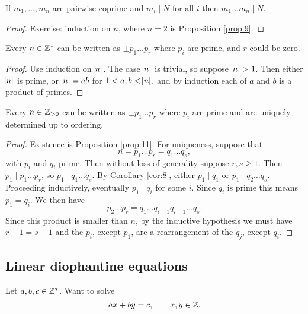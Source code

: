 \begin{corollary}
\label{cor:10}
If $ m_1, \dots, m_n $ are pairwise coprime and $ m_i \mid N $ for all $ i $ then $ m_1 \dots m_n \mid N $.
\end{corollary}

\begin{proof}
Exercise: induction on $ n $, where $ n = 2 $ is Proposition \ref{prop:9}.
\end{proof}

\begin{proposition}
\label{prop:11}
Every $ n \in \mathbb{Z}^* $ can be written as $ \pm p_1 \dots p_r $ where $ p_i $ are prime, and $ r $ could be zero.
\end{proposition}

\begin{proof}
Use induction on $ \abs{n} $. The case $ \abs{n} $ is trivial, so suppose $ \abs{n} > 1 $. Then either $ \abs{n} $ is prime, or $ \abs{n} = ab $ for $ 1 < a, b < \abs{n} $, and by induction each of $ a $ and $ b $ is a product of primes.
\end{proof}

\begin{theorem}
Every $ n \in \mathbb{Z}_{> 0} $ can be written as $ \pm p_1 \dots p_r $ where $ p_i $ are prime and are uniquely determined up to ordering.
\end{theorem}

\begin{proof}
Existence is Proposition \ref{prop:11}. For uniqueness, suppose that
$$ n = p_1 \dots p_r = q_1 \dots q_s, $$
with $ p_i $ and $ q_i $ prime. Then without loss of generality suppose $ r, s \ge 1 $. Then $ p_1 \mid p_1 \dots p_r $, so $ p_1 \mid q_1 \dots q_s $. By Corollary \ref{cor:8}, either $ p_1 \mid q_1 $ or $ p_1 \mid q_2 \dots q_s $. Proceeding inductively, eventually $ p_1 \mid q_i $ for some $ i $. Since $ q_i $ is prime this means $ p_1 = q_i $. We then have
$$ p_2 \dots p_r = q_1 \dots q_{i - 1}q_{i + 1} \dots q_s. $$
Since this product is smaller than $ n $, by the inductive hypothesis we must have $ r - 1 = s - 1 $ and the $ p_i $, except $ p_1 $, are a rearrangement of the $ q_j $, except $ q_i $.
\end{proof}

\subsection{Linear diophantine equations}

Let $ a, b, c \in \mathbb{Z}^* $. Want to solve
$$ ax + by = c, \qquad x, y \in \mathbb{Z}. $$

